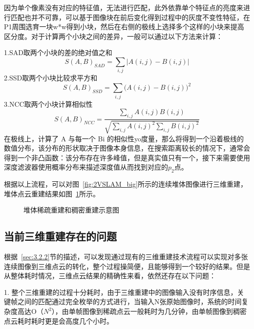因为单个像素没有对应的特征值，无法进行匹配，此外依靠单个特征点的亮度来进行匹配也并不可靠，可以基于图像块在前后变化得到过程中的灰度不变性特征，在P1周围选育一块w*w得到小块，然后在右侧的极线上选择多个这样的小块来提高区分度。对于计算两个小块之间的差异，一般可以通过以下方法来计算：

1.SAD取两个小块的差的绝对值之和
\begin{equation}
  S{(A,B)}_{SAD}=\sum_{i,j}\left|A(i,j)-B(i,j)\right|
\end{equation}
2.SSD取两个小块比较求平方和
\begin{equation}
S{(A,B)}_{SSD}=\sum_{i,j}(A(i,j)-B{(i,j))}^2
\end{equation}
3.NCC取两个小块计算相似性
\begin{equation}
  S{(A,B)}_{NCC}=\frac{{\displaystyle\sum_{i,j}}A(i,j)B(i,j)}{\sqrt{{\displaystyle\sum_{i,j}}A{(i,j)}^2\underset{i,j}\sum B{(i,j)}^2}}
\end{equation}
在极线上，计算了 A 与每一个 Bi 的相似性yo度量，那么将得到一个沿着极线的数值分布，该分布的形状取决于图像本身信息，在搜索距离较长的情况下，通常会得到一个非凸函数：该分布存在许多峰值，但是真实值只有一个，接下来需要使用深度滤波器使用概率分布来描述深度值从而找到对应的$p_2$点。

根据以上流程，可以对图~\ref{fig:2VSLAM_big}所示的连续堆体图像进行三维重建，堆体点云重建结果如图~\ref{fig:3dconstr_sparse}所示。
\begin{figure}[H]
  \centering
  \vskip0.5cm
  \caption{堆体稀疏重建和稠密重建示意图}
  \label{fig:3dconstr_sparse}
\end{figure}
\subsection{当前三维重建存在的问题}
\label{sec:3.2.3}
根据~\ref{sec:3.2.2}节的描述，可以发现通过现有的三维重建技术流程可以实现对多张连续图像到三维点云的转化，整个过程操简便，且能够得到一个较好的结果。但是从整体耗时情况，三维点云结果的精确性来看，依然还存在以下问题：

1. 整个三维重建的过程十分耗时，由于三维重建中的图像输入没有时序信息，关键帧之间的匹配通过完全枚举的方式进行，当输入N张原始图像时，系统的时间复杂度高达O（$N^2$），由单帧图像到稀疏点云一般耗时为几分钟，由单帧图像到稠密点云耗时耗时更是会高度几个小时。

